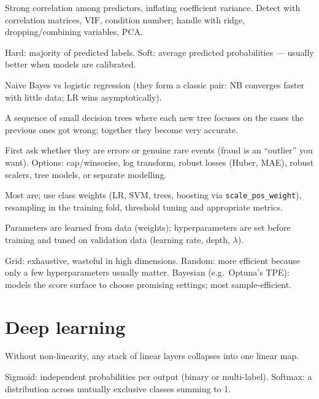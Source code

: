 \A Strong correlation among predictors, inflating coefficient variance. Detect with correlation matrices, VIF, condition number; handle with ridge, dropping/combining variables, PCA.

\A Hard: majority of predicted labels. Soft: average predicted probabilities --- usually better when models are calibrated.

\A Naive Bayes vs logistic regression (they form a classic pair: NB converges faster with little data; LR wins asymptotically).

\A A sequence of small decision trees where each new tree focuses on the cases the previous ones got wrong; together they become very accurate.

\A First ask whether they are errors or genuine rare events (fraud is an ``outlier'' you want). Options: cap/winsorise, log transform, robust losses (Huber, MAE), robust scalers, tree models, or separate modelling.

\A Most are; use class weights (LR, SVM, trees, boosting via \texttt{scale\_pos\_weight}), resampling in the training fold, threshold tuning and appropriate metrics.

\A Parameters are learned from data (weights); hyperparameters are set before training and tuned on validation data (learning rate, depth, $\lambda$).

\A Grid: exhaustive, wasteful in high dimensions. Random: more efficient because only a few hyperparameters usually matter. Bayesian (e.g.\ Optuna's TPE): models the score surface to choose promising settings; most sample-efficient.

\section{Deep learning}
\A Without non-linearity, any stack of linear layers collapses into one linear map.

\A Sigmoid: independent probabilities per output (binary or multi-label). Softmax: a distribution across mutually exclusive classes summing to 1.

